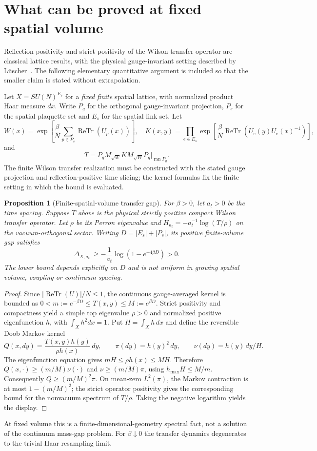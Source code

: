 \documentclass[11pt,a4paper]{article}
\newtheorem{proposition}[theorem]{Proposition}
\theoremstyle{remark}
\begin{document}
\section{What can be proved at fixed spatial volume}
Reflection positivity and strict positivity of the Wilson
transfer operator are classical lattice results, with the
physical gauge-invariant setting described by L\"uscher~\cite{Luscher}.
The following elementary quantitative argument is included so
that the smaller claim is stated without extrapolation.

Let $X=SU(N)^{E_s}$ for a \emph{fixed finite} spatial
lattice, with normalized product Haar measure $dx$.
Write $P_g$ for the orthogonal gauge-invariant projection,
$P_s$ for the spatial plaquette set and $E_s$ for the spatial
link set. Let
\[
W(x)=\exp\left[\frac\beta N\sum_{p\in P_s}
\operatorname{ReTr}(U_p(x))\right],
\quad
K(x,y)=\prod_{e\in E_s}
\exp\left[\frac\beta N\operatorname{ReTr}
(U_e(y)U_e(x)^{-1})\right],
\]
and
\[
T=P_g M_{\sqrt W}K M_{\sqrt W}P_g
     \big|_{\operatorname{ran}P_g}.
\]
The finite Wilson transfer realization must be constructed
with the stated gauge projection and reflection-positive time
slicing; the kernel formulas fix the finite setting in which
the bound is evaluated.

\begin{proposition}[Finite-spatial-volume transfer gap]\label{prop:finite}
For $\beta>0$, let $a_t>0$ be the time spacing. Suppose $T$
above is the physical strictly positive compact Wilson
transfer operator. Let $\rho$ be its Perron eigenvalue and
$H_{a_t}=-a_t^{-1}\log(T/\rho)$ on the vacuum-orthogonal
sector. Writing $D=|E_s|+|P_s|$, its positive
finite-volume gap satisfies
\[
\boxed{\ \Delta_{X,a_t}\ \ge
-\frac{1}{a_t}\log\!\left(1-e^{-4\beta D}\right)>0.\ }
\]
The lower bound depends explicitly on $D$ and is \emph{not}
uniform in growing spatial volume, coupling or continuum spacing.
\end{proposition}
\begin{proof}
Since $|\operatorname{ReTr}(U)|/N\le1$,
the continuous gauge-averaged kernel is bounded as
$0<m:=e^{-\beta D}\le T(x,y)\le M:=e^{\beta D}$.
Strict positivity and compactness yield a simple top
eigenvalue $\rho>0$ and normalized positive eigenfunction
$h$, with $\int_Xh^2dx=1$. Put $H=\int_Xh\,dx$ and define
the reversible Doob Markov kernel
\[
Q(x,dy)=\frac{T(x,y)h(y)}{\rho h(x)}\,dy,
\qquad \pi(dy)=h(y)^2\,dy,\qquad
\nu(dy)=h(y)\,dy/H.
\]
The eigenfunction equation gives
$mH\le\rho h(x)\le MH$. Therefore
$Q(x,\cdot)\ge(m/M)\nu(\cdot)$ and
$\nu\ge(m/M)\pi$, using $h_{\max}H\le M/m$.
Consequently $Q\ge(m/M)^2\pi$.
On mean-zero $L^2(\pi)$, the Markov contraction is at
most $1-(m/M)^2$; the strict operator positivity gives the
corresponding bound for the nonvacuum spectrum of $T/\rho$.
Taking the negative logarithm yields the display.
\end{proof}
At fixed volume this is a finite-dimensional-geometry
spectral fact, not a solution of the continuum mass-gap
problem. For $\beta\downarrow0$ the transfer dynamics
degenerates to the trivial Haar resampling limit.
\end{document}
